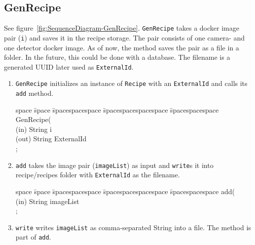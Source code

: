 \subsection{GenRecipe} \label{subseb:genrecipe}
See figure~\ref{fig:SequenceDiagram-GenRecipe}.
\texttt{GenRecipe} takes a docker image pair (\texttt{i}) and saves it in the recipe storage. The pair consists of one camera- and one detector docker image. As of now, the method saves the pair as a file in a folder. In the future, this could be done with a database. The filename is a generated UUID later used as \texttt{ExternalId}.
\begin{enumerate}
    \item \texttt{GenRecipe} initializes an instance of \texttt{Recipe} with an \texttt{ExternalId} and calls its \texttt{add} method.
    \begin{tabbing}
    space \= space \= spacespacespace \= spacespacespacespace \= spacespacespace \kill
    \>  GenRecipe(\\
    \>  \>  (in)	 \> 	String          \> i\\
    \>  \>  (out)	 \> 	String          \> ExternalId\\; 
    \end{tabbing}
    \item \texttt{add} takes the image pair (\texttt{imageList}) as input and \texttt{write}s it into recipe/recipes folder with \texttt{ExternalId} as the filename.
    \begin{tabbing}
    space \= space \= spacespacespace \= spacespacespacespace \= spacespacespace \kill
    \>  add(\\
    \>  \>  (in)	 \> 	String          \> imageList\\;  
    \end{tabbing} \label{sign:add}
    \item \texttt{write} writes \texttt{imageList} as comma-separated String into a file. The method is part of \texttt{add}. \label{sign:write}
\end{enumerate}

